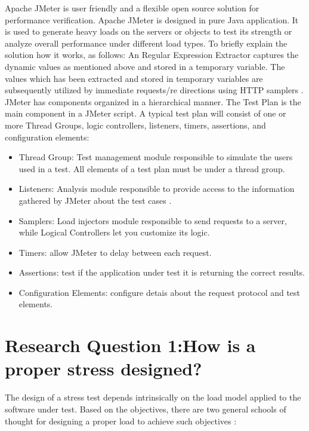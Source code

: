 \documentclass{report}
\begin{document}
Apache JMeter is user friendly and a flexible open source solution for performance verification. Apache JMeter is designed in pure Java application. It is used to generate heavy loads on the servers or objects to test its strength or analyze overall performance under different load types. To briefly explain the solution how it works, as follows: An Regular Expression Extractor captures the dynamic values as mentioned above and stored in a temporary variable. The values which has been extracted and stored in temporary variables are subsequently utilized by immediate requests/re directions using HTTP samplers \cite{Kiran2015}. JMeter has components organized  in a hierarchical manner. The Test Plan is the main component in a JMeter script. A typical test plan will consist of one or more Thread Groups, logic controllers, listeners, timers, assertions, and configuration elements:

\begin{itemize}
\item Thread Group: Test management module responsible to simulate the users used in a test. All elements of a test plan must be under a thread group.
\item Listeners: Analysis module responsible to provide access to the information gathered by JMeter about the test cases .
\item Samplers: Load injectors module responsible to send requests to a server, while Logical Controllers let you customize its logic.
\item Timers: allow JMeter to delay between each request.
\item Assertions: test if the application under test it is returning the correct results.
\item Configuration Elements: configure detais about the request protocol and test elements.
\end{itemize}



\FloatBarrier

\section{Research Question 1:How is a proper stress designed?}


The design of a stress test depends intrinsically on the load model applied to the software under test. Based on the objectives, there are two general schools of thought for designing a proper load to achieve such objectives \cite{Afzal2009a}:
\end{document}

